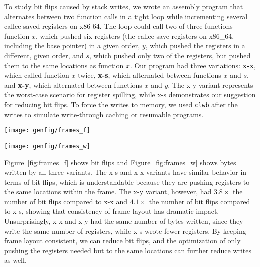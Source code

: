 To study bit flips caused by stack writes, we wrote an assembly program
that alternates between two function calls in a tight loop while incrementing
several callee-saved registers on x86-64. The loop could call two of three
functions---function $x$, which pushed six registers (the callee-save registers on x86\_64,
including the base pointer) in a given order, $y$,
which pushed the registers in a different, given order, and $s$, which pushed only
two of the registers, but pushed them to the same locations as function $x$.
Our program had three variations: \textbf{x-x}, which called function $x$ twice,
\textbf{x-s}, which alternated between functions $x$ and $s$, and \textbf{x-y},
which alternated between functions $x$ and $y$.  The x-y variant represents
the worst-case scenario for register spilling, while x-s
demonstrates our suggestion for reducing bit flips. To force the writes to
memory, we used \texttt{clwb} after the writes to simulate write-through
caching or resumable programs.


\begin{SCfigure}
	\centering
	\texttt{[image: genfig/frames\_f]}
	\caption{Bits flipped by different stack frame layouts.}
	\label{fig:frames_f}
\end{SCfigure}

\begin{SCfigure}
	\centering
	\texttt{[image: genfig/frames\_w]}
	\caption{Bytes written by different stack frame layouts.}
	\label{fig:frames_w}
\end{SCfigure}


Figure~\ref{fig:frames_f} shows bit flips and Figure~\ref{fig:frames_w} shows bytes written by all
three variants. The x-s and x-x variants have similar behavior in terms of bit
flips, which is understandable because they are pushing registers to the same
locations within the frame. The x-y variant, however, had $3.8\times$ the number
of bit flips compared to x-x and $4.1\times$ the number of bit flips compared to x-s, showing that
consistency of frame layout has dramatic impact. Unsurprisingly, x-x and x-y had
the same number of bytes written, since they write the same number of
registers, while x-s wrote fewer registers. By keeping frame layout consistent,
we can reduce bit flips, and the optimization of only pushing the registers
needed but to the same locations can further reduce writes as well.

